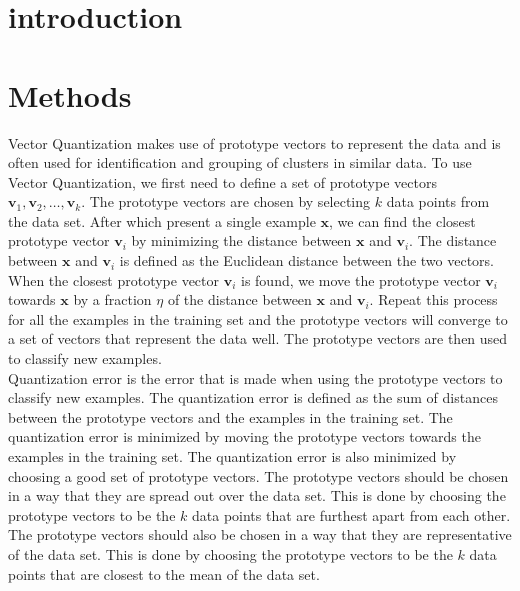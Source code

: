 \documentclass[twoside, a4paper, fleqn, reqno]{article}
\begin{document}
\maketitle

\section{introduction}

\section{Methods}

Vector Quantization makes use of prototype vectors to represent the data and is often used for identification and grouping of clusters in similar data.
To use Vector Quantization, we first need to define a set of prototype vectors $\mathbf{v}_1, \mathbf{v}_2, \ldots, \mathbf{v}_k$.
The prototype vectors are chosen by selecting $k$ data points from the data set.
After which present a single example $\mathbf{x}$, we can find the closest prototype vector $\mathbf{v}_i$ by minimizing the distance between $\mathbf{x}$ and $\mathbf{v}_i$.
The distance between $\mathbf{x}$ and $\mathbf{v}_i$ is defined as the Euclidean distance between the two vectors.
When the closest prototype vector $\mathbf{v}_i$ is found, we move the prototype vector $\mathbf{v}_i$ towards $\mathbf{x}$ by a fraction $\eta$ of the distance between $\mathbf{x}$ and $\mathbf{v}_i$.
Repeat this process for all the examples in the training set and the prototype vectors will converge to a set of vectors that represent the data well.
The prototype vectors are then used to classify new examples. \\

Quantization error is the error that is made when using the prototype vectors to classify new examples.
The quantization error is defined as the sum of distances between the prototype vectors and the examples in the training set.
The quantization error is minimized by moving the prototype vectors towards the examples in the training set.
The quantization error is also minimized by choosing a good set of prototype vectors.
The prototype vectors should be chosen in a way that they are spread out over the data set.
This is done by choosing the prototype vectors to be the $k$ data points that are furthest apart from each other.
The prototype vectors should also be chosen in a way that they are representative of the data set.
This is done by choosing the prototype vectors to be the $k$ data points that are closest to the mean of the data set.
\end{document}
